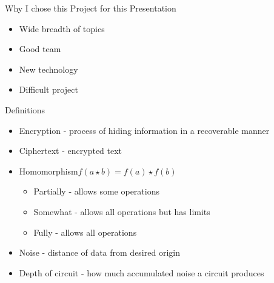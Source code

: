 \documentclass[dvips,11pt]{beamer}
\begin{document}
\begin{frame}{Why I chose this Project for this Presentation}
\begin{itemize}
\item Wide breadth of topics
\item Good team
\item New technology
\item Difficult project
\end{itemize}
\end{frame}


\begin{frame}{Definitions}
\begin{itemize}
\item Encryption - process of hiding information in a recoverable manner
\item Ciphertext - encrypted text
\item Homomorphism\hfill\(f(a\star b) = f(a)\star f(b)\)
  \begin{itemize}
    \item Partially - allows some operations
    \item Somewhat - allows all operations but has limits
    \item Fully - allows all operations
  \end{itemize}
\item Noise - distance of data from desired origin
\item Depth of circuit - how much accumulated noise a circuit produces
\end{itemize}
\end{frame} 
\end{document}
